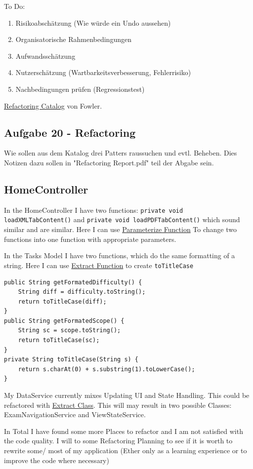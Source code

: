 \documentclass[a4paper]{article}
\begin{document}
To Do:

\begin{enumerate}
    \item Risikoabschätzung (Wie würde ein Undo aussehen)
    \item Organisatorische Rahmenbedingungen
    \item Aufwandsschätzung
    \item Nutzerschätzung (Wartbarkeitsverbesserung, Fehlerrisiko)
    \item Nachbedingungen prüfen (Regressionstest)
\end{enumerate}

\href{https://refactoring.com/catalog/index.html}{Refactoring Catalog} von Fowler.

\subsection{Aufgabe 20 - Refactoring}

Wie sollen aus dem Katalog drei Patters raussuchen und evtl. Beheben. Dies Notizen dazu sollen in "Refactoring Report.pdf" teil der Abgabe sein.

\subsection{HomeController}

In the HomeController I have two functions: \lstinline|private void loadXMLTabContent()| and \lstinline|private void loadPDFTabContent()| which sound similar and are similar. Here I can use \href{https://refactoring.com/catalog/parameterizeFunction.html}{Parameterize Function} To change two functions into one function with appropriate parameters.

In the Tasks Model I have two functions, which do the same formatting of a string. Here I can use \href{https://refactoring.com/catalog/extractFunction.html}{Extract Function} to create \lstinline|toTitleCase| 

\begin{lstlisting}[style=javastyle]
public String getFormatedDifficulty() {
    String diff = difficulty.toString();
    return toTitleCase(diff);
}
public String getFormatedScope() {
    String sc = scope.toString();
    return toTitleCase(sc);
}
private String toTitleCase(String s) {
    return s.charAt(0) + s.substring(1).toLowerCase();
}
\end{lstlisting}

My DataService currently mixes Updating UI and State Handling. This could be refactored with \href{Uhttps://refactoring.com/catalog/extractClass.htmlRL}{Extract Class}. This will may result in two possible Classes: ExamNavigationService and ViewStateService.

In Total I have found some more Places to refactor and I am not satisfied with the code quality. I will to some Refactoring Planning to see if it is worth to rewrite some/ most of my application (Ether only as a learning experience or to improve the code where necessary)
\end{document}
